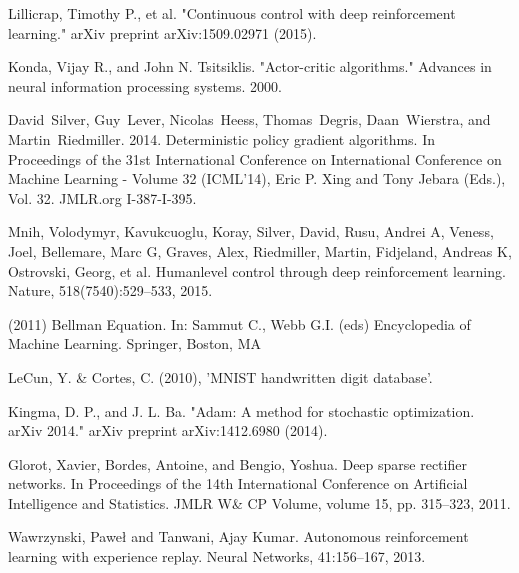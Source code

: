\documentclass[peerreview,onecolumn]{IEEEtran}
\begin{document}
\begin{thebibliography}{1}

  Lillicrap, Timothy P., et al. "Continuous control with deep reinforcement learning." arXiv preprint arXiv:1509.02971 (2015).
  
  Konda, Vijay R., and John N. Tsitsiklis. "Actor-critic algorithms." Advances in neural information processing systems. 2000.
  
  David~Silver, Guy~Lever, Nicolas~Heess, Thomas~Degris, Daan~Wierstra, and Martin~Riedmiller. 2014. Deterministic policy gradient algorithms. In Proceedings of the 31st International Conference on International Conference on Machine Learning - Volume 32 (ICML'14), Eric P. Xing and Tony Jebara (Eds.), Vol. 32. JMLR.org I-387-I-395.
  
  
  Mnih, Volodymyr, Kavukcuoglu, Koray, Silver, David, Rusu, Andrei A, Veness, Joel, Bellemare,
Marc G, Graves, Alex, Riedmiller, Martin, Fidjeland, Andreas K, Ostrovski, Georg, et al. Humanlevel control through deep reinforcement learning. Nature, 518(7540):529–533, 2015.


(2011) Bellman Equation. In: Sammut C., Webb G.I. (eds) Encyclopedia of Machine Learning. Springer, Boston, MA


	LeCun, Y. \& Cortes, C. (2010), 'MNIST handwritten digit database'.
	
	Kingma, D. P., and J. L. Ba. "Adam: A method for stochastic optimization. arXiv 2014." arXiv preprint arXiv:1412.6980 (2014).
	
	Glorot, Xavier, Bordes, Antoine, and Bengio, Yoshua. Deep sparse rectifier networks. In Proceedings of the 14th International Conference on Artificial Intelligence and Statistics. JMLR W\& CP Volume, volume 15, pp. 315–323, 2011.
	
	
	Wawrzynski, Paweł and Tanwani, Ajay Kumar. Autonomous reinforcement learning with experience replay. Neural Networks, 41:156–167, 2013.
	 
\end{thebibliography}

\end{document}
